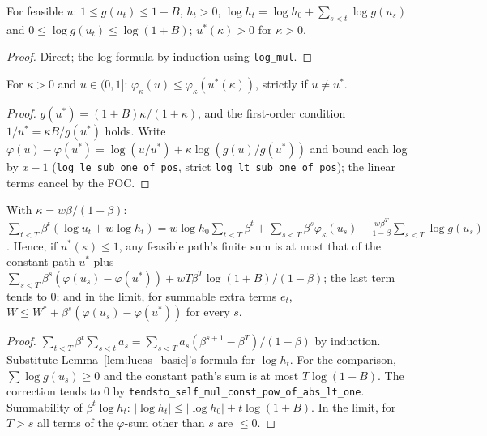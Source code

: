 \begin{lemma}
\label{lem:lucas_basic}
\leanok
{}
For feasible $u$: $1 \le g(u_t) \le 1 + B$, $h_t > 0$, $\log h_t = \log h_0 + \sum_{s<t}\log g(u_s)$ and
$0 \le \log g(u_t) \le \log(1+B)$; $u^*(\kappa) > 0$ for $\kappa > 0$.
\end{lemma}
\begin{proof}
\leanok
Direct; the log formula by induction using \texttt{log\_mul}.
\end{proof}

\begin{lemma}
\label{lem:lucas_phi}
\leanok
{}
For $\kappa > 0$ and $u \in (0,1]$: $\varphi_\kappa(u) \le \varphi_\kappa(u^*(\kappa))$, strictly if $u \ne u^*$.
\end{lemma}
\begin{proof}
\leanok
$g(u^*) = (1+B)\kappa/(1+\kappa)$, and the first-order condition $1/u^* = \kappa B/g(u^*)$ holds. Write
$\varphi(u) - \varphi(u^*) = \log(u/u^*) + \kappa\log(g(u)/g(u^*))$ and bound each log by $x - 1$
(\texttt{log\_le\_sub\_one\_of\_pos}, strict \texttt{log\_lt\_sub\_one\_of\_pos}); the linear terms cancel by the FOC.
\end{proof}

\begin{lemma}
\label{lem:lucas_separate}
\leanok
{}
With $\kappa = w\beta/(1-\beta)$:
$\sum_{t<T}\beta^t(\log u_t + w\log h_t) = w\log h_0\sum_{t<T}\beta^t + \sum_{s<T}\beta^s\varphi_\kappa(u_s) -
\frac{w\beta^T}{1-\beta}\sum_{s<T}\log g(u_s)$. Hence, if $u^*(\kappa) \le 1$, any feasible path's finite sum is at
most that of the constant path $u^*$ plus $\sum_{s<T}\beta^s(\varphi(u_s) - \varphi(u^*)) + wT\beta^T\log(1+B)/(1-\beta)$;
the last term tends to $0$; and in the limit, for summable extra terms $e_t$,
$W \le W^* + \beta^s(\varphi(u_s) - \varphi(u^*))$ for every $s$.
\end{lemma}
\begin{proof}
\leanok
$\sum_{t<T}\beta^t\sum_{s<t}a_s = \sum_{s<T}a_s(\beta^{s+1} - \beta^T)/(1-\beta)$ by induction. Substitute
Lemma~\ref{lem:lucas_basic}'s formula for $\log h_t$. For the comparison, $\sum \log g(u_s) \ge 0$ and the constant
path's sum is at most $T\log(1+B)$. The correction tends to $0$ by
\texttt{tendsto\_self\_mul\_const\_pow\_of\_abs\_lt\_one}. Summability of $\beta^t\log h_t$: $|\log h_t| \le
|\log h_0| + t\log(1+B)$. In the limit, for $T > s$ all terms of the $\varphi$-sum other than $s$ are $\le 0$.
\end{proof}

